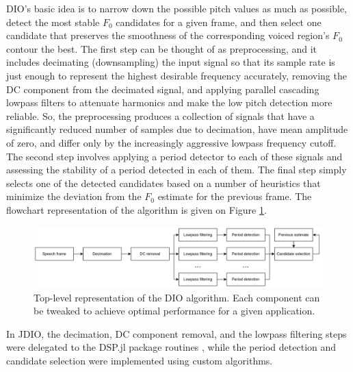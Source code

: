 \documentclass[a4paper]{article}
\begin{document}
DIO's basic idea is to narrow down the possible pitch values as much as possible, detect the most stable $F_0$ candidates for a given frame, and then select one candidate that preserves the smoothness of the corresponding voiced region's $F_0$ contour the best. The first step can be thought of as preprocessing, and it includes decimating (downsampling) the input signal so that its sample rate is just enough to represent the highest desirable frequency accurately, removing the DC component from the decimated signal, and applying parallel cascading lowpass filters to attenuate harmonics and make the low pitch detection more reliable. So, the preprocessing produces a collection of signals that have a significantly reduced number of samples due to decimation, have mean amplitude of zero, and differ only by the increasingly aggressive lowpass frequency cutoff. The second step involves applying a period detector to each of these signals and assessing the stability of a period detected in each of them. The final step simply selects one of the detected candidates based on a number of heuristics that minimize the deviation from the $F_0$ estimate for the previous frame. The flowchart representation of the algorithm is given on Figure \ref{fig:DIO_diagram}.

\begin{figure}
    \includegraphics{graphics/DIO_diagram.png}
    \caption{Top-level representation of the DIO algorithm. Each component can be tweaked to achieve optimal performance for a given application.}
    \label{fig:DIO_diagram}
\end{figure}

In JDIO, the decimation, DC component removal, and the lowpass filtering steps were delegated to the DSP.jl package routines \cite{DSP}, while the period detection and candidate selection were implemented using custom algorithms.
\end{document}

